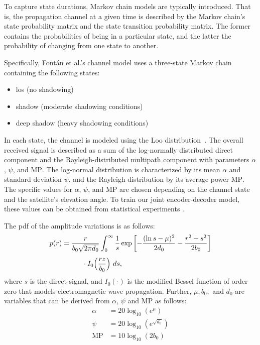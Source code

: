 \documentclass[conference]{IEEEtran}
\newcommand\MP{\ensuremath{\mathrm{MP}}\xspace}
\begin{document}
To capture state durations, Markov chain models are typically introduced.
That is, the propagation channel at a given time is described by the Markov chain's state probability matrix and the state transition probability matrix.
The former contains the probabilities of being in a particular state, and the latter the probability of changing from one state to another.

Specifically, Fontán et al.'s channel model \cite{966585} uses a three-state Markov chain containing the following states:
%
\begin{itemize}
  \item \ac{los} (no shadowing)
  \item shadow (moderate shadowing conditions)
  \item deep shadow (heavy shadowing conditions)
\end{itemize}
%
In each state, the channel is modeled using the Loo distribution~\cite{1623307}. 
The overall received signal is described as a sum of the log-normally distributed direct component and the Rayleigh-distributed multipath component with parameters $\alpha$, $\psi$, and \MP.
The log-normal distribution is characterized by its mean $\alpha$ and standard deviation $\psi$, and the Rayleigh distribution by its average power \MP.
The specific values for $\alpha$, $\psi$, and \MP are chosen depending on the channel state and the satellite's elevation angle.
To train our joint encoder-decoder model, these values can be obtained from statistical experiments \cite{channel-params}.

The \ac{pdf} of the amplitude variations is as follows:
\begin{align}
  p(r) &= \frac{r}{b_0\sqrt{2\pi d_0}} \nonumber
  \int_{0}^{\infty}\frac{1}{s} \exp\left[-\frac{(\ln s - \mu)^2}{2d_0} - \frac{r^2 + s^2}{2b_0}\right] \\[1ex]
  &\hphantom{=\int_{0}^{\infty}} \cdot I_0\Big(\frac{rz}{b_0}\Big)\ ds,
\end{align}
%
where $s$ is the direct signal, and $I_0(\cdot)$ is the modified Bessel function of order zero that models electromagnetic wave propagation.
Further, $\mu, b_0,$ and $d_0$ are variables that can be derived from $\alpha$, $\psi$ and \MP as follows:
%
\begin{align}
\alpha &= 20\log_{10}(e^\mu) \\
  \psi &= 20\log_{10}(e^{\sqrt{d_0}}) \\
   \MP &= 10\log_{10}(2b_0)
\end{align}
\end{document}
